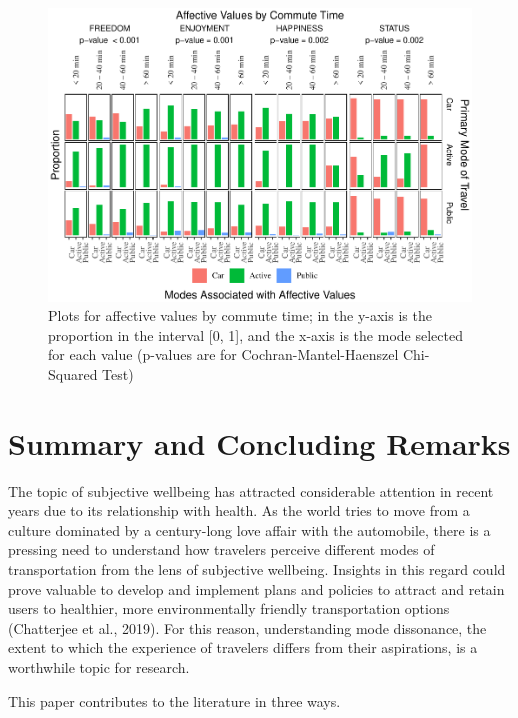 \documentclass[]{elsarticle} %
\makeatletter
\def\maxwidth{\ifdim\Gin@nat@width>\linewidth\linewidth
\else\Gin@nat@width\fi}
\let\Oldincludegraphics\includegraphics
\renewcommand{\includegraphics}[1]{\Oldincludegraphics[width=\maxwidth]{#1}}
\makeatother
\begin{document}
\begin{figure}
\centering
\includegraphics{Dissonance_Santiago_v2_files/figure-latex/figure-bar-plots-by-attribute-and-travel-time-1.pdf}
\caption{\label{fig:bar-plots-by-travel-time}Plots for affective values
by commute time; in the y-axis is the proportion in the interval {[}0,
1{]}, and the x-axis is the mode selected for each value (p-values are
for Cochran-Mantel-Haenszel Chi-Squared Test)}
\end{figure}

\hypertarget{summary-and-concluding-remarks}{%
\section{Summary and Concluding
Remarks}\label{summary-and-concluding-remarks}}

The topic of subjective wellbeing has attracted considerable attention
in recent years due to its relationship with health. As the world tries
to move from a culture dominated by a century-long love affair with the
automobile, there is a pressing need to understand how travelers
perceive different modes of transportation from the lens of subjective
wellbeing. Insights in this regard could prove valuable to develop and
implement plans and policies to attract and retain users to healthier,
more environmentally friendly transportation options (Chatterjee et al.,
2019). For this reason, understanding mode dissonance, the extent to
which the experience of travelers differs from their aspirations, is a
worthwhile topic for research.

This paper contributes to the literature in three ways.
\end{document}
